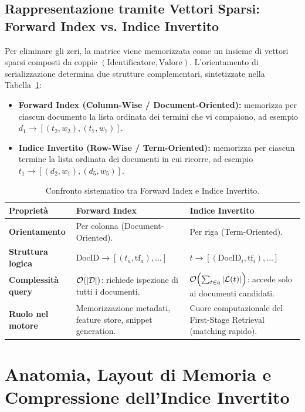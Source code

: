 \subsection{Rappresentazione tramite Vettori Sparsi: Forward Index vs. Indice Invertito}
\label{subsec:vettori-sparsi-fwd-inv}
Per eliminare gli zeri, la matrice viene memorizzata come un insieme di vettori sparsi composti da coppie $(\text{Identificatore}, \text{Valore})$. L'orientamento di serializzazione determina due strutture complementari, sintetizzate nella Tabella~\ref{tab:fwd-vs-inv}:
\begin{itemize}
    \item \textbf{Forward Index (Column-Wise / Document-Oriented):} memorizza per ciascun documento la lista ordinata dei termini che vi compaiono, ad esempio $d_1 \to [(t_2, w_2), (t_7, w_7)]$.
    \item \textbf{Indice Invertito (Row-Wise / Term-Oriented):} memorizza per ciascun termine la lista ordinata dei documenti in cui ricorre, ad esempio $t_1 \to [(d_2, w_1), (d_5, w_5)]$.
\end{itemize}

\begin{table}[H]
\centering
\small
\begin{tabularx}{\linewidth}{l >{\raggedright\arraybackslash}X >{\raggedright\arraybackslash}X}
\toprule
\textbf{Propriet\`a} & \textbf{Forward Index} & \textbf{Indice Invertito} \\
\midrule
\textbf{Orientamento} & Per colonna (Document-Oriented). & Per riga (Term-Oriented). \\
\addlinespace
\textbf{Struttura logica} & $\text{DocID} \to [(t_a, \text{tf}_a), \dots]$ & $t \to [(\text{DocID}_i, \text{tf}_i), \dots]$ \\
\addlinespace
\textbf{Complessit\`a query} & $\mathcal{O}\!\left(|\mathcal{D}|\right)$: richiede ispezione di tutti i documenti. & $\mathcal{O}\!\left(\sum_{t \in q} |\mathcal{L}(t)|\right)$: accede solo ai documenti candidati. \\
\addlinespace
\textbf{Ruolo nel motore} & Memorizzazione metadati, feature store, snippet generation. & Cuore computazionale del First-Stage Retrieval (matching rapido). \\
\bottomrule
\end{tabularx}
\caption{Confronto sistematico tra Forward Index e Indice Invertito.}
\label{tab:fwd-vs-inv}
\end{table}

\FloatBarrier
\section{Anatomia, Layout di Memoria e Compressione dell'Indice Invertito}
\label{sec:anatomia-compressione-indice}

